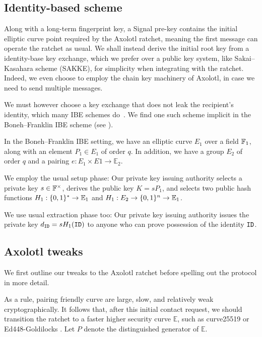\documentclass[twoside,letterpaper]{sig-alternate}
\begin{document}
\subsection{Identity-based scheme}

Along with a long-term fingerprint key,
a Signal pre-key contains the initial elliptic curve point required
by the Axolotl ratchet, meaning
 the first message can operate the ratchet as usual.
We shall instead derive the initial root key from a identity-base key
exchange, which we prefer over a public key system,
 like Sakai–Kasahara scheme (SAKKE),
for simplicity when integrating with the ratchet.
Indeed, we even choose to employ the chain key machinery of Axolotl,
 in case we need to send multiple messages. 

We must however choose a key exchange that does not leak the recipient's
identity, which many IBE schemes do~\cite{AnonIBE}.  
We find one such scheme implicit in the Boneh–Franklin IBE scheme 
\cite{BF-IBE} (see \cite[??]{BoyenMIBS}).

In the Boneh–Franklin IBE setting,
we have an elliptic curve $E_1$ over a field $\mathbb{F}_1$,
 along with an element $P_1 \in E_1$ of order $q$.
In addition, we have a group $E_2$ of order $q$ and 
 a pairing $e : E_1 \times E1 \to \mathbb{E}_2$.

We employ the usual setup phase: 
Our private key issuing authority
 selects a private key $s \in \mathbb{F}^\times$,
 derives the public key $K = s P_1$, and
 selects two public hash functions
  $H_1 : \{0,1\}^* \to \mathbb{E}_1$ and $H_1 : E_2 \to \{0,1\}^n \to \mathbb{E}_1$.

We use usual extraction phase too: 
Our private key issuing authority
issues the private key $d_{\mathtt{ID}} = s H_1(\mathtt{ID})$ to anyone who
 can prove possession of the identity $\mathtt{ID}$.

\subsection{Axolotl tweaks} %

We first outline our tweaks to the Axolotl ratchet before 
 spelling out the protocol in more detail.

As a rule, pairing friendly curve are large, slow, and relatively
 weak cryptographically.
It follows that, after this initial contact request, we should 
transition the ratchet to a faster higher security curve $\mathbb{E}$,
such as curve25519 \cite{DJB-Curve25519}
 or Ed448-Goldilocks \cite{Ed448-Goldilocks}.
Let $P$ denote the distinguished generator of $\mathbb{E}$.
\end{document}
